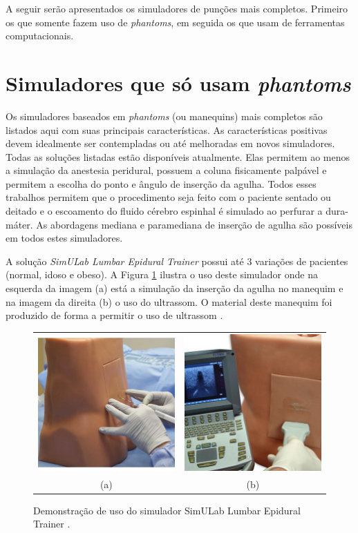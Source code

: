 A seguir serão apresentados os simuladores de punções mais completos. Primeiro os que somente fazem uso de \textit{phantoms}, em seguida os que usam de ferramentas computacionais.  

\section{Simuladores que só usam \textit{phantoms}} \label{sec:SimuladoresPhantoms}

Os simuladores baseados em \textit{phantoms} (ou manequins) mais completos são listados aqui com suas principais características. As características positivas devem idealmente ser contempladas ou até melhoradas em novos simuladores. Todas as soluções listadas estão disponíveis atualmente. Elas permitem ao menos a simulação da anestesia peridural, possuem a coluna fisicamente palpável e permitem a escolha do ponto e ângulo de inserção da agulha. Todos esses trabalhos permitem que o procedimento seja feito com o paciente sentado ou deitado e o escoamento do fluido cérebro espinhal é simulado ao perfurar a dura-máter. As abordagens mediana e paramediana de inserção de agulha são possíveis em todos estes simuladores.

A solução \textit{SimULab Lumbar Epidural Trainer} possui até 3 variações de pacientes (normal, idoso e obeso). A Figura \ref{fig:simuladorSimulab} ilustra o uso deste simulador onde na esquerda da imagem (a) está a simulação da inserção da agulha no manequim e na imagem da direita (b) o uso do ultrassom. O material deste manequim foi produzido de forma a permitir o uso de ultrassom \cite{SimulabCorporation2008}. 

\begin{figure}[ht!]
    \centering
        \begin{tabular}{cc}
        \includegraphics[width=0.3\linewidth]{capitulos/figuras/simulab-insercao-agulha.jpg} & 
        \includegraphics[width=0.3\linewidth]{capitulos/figuras/simulab-ultrassom.jpg} 
        \\
        (a) & (b)
        \end{tabular}
    \caption{Demonstração de uso do simulador SimULab Lumbar Epidural Trainer \cite{SimulabCorporation2008}.}
    \label{fig:simuladorSimulab}
\end{figure}

